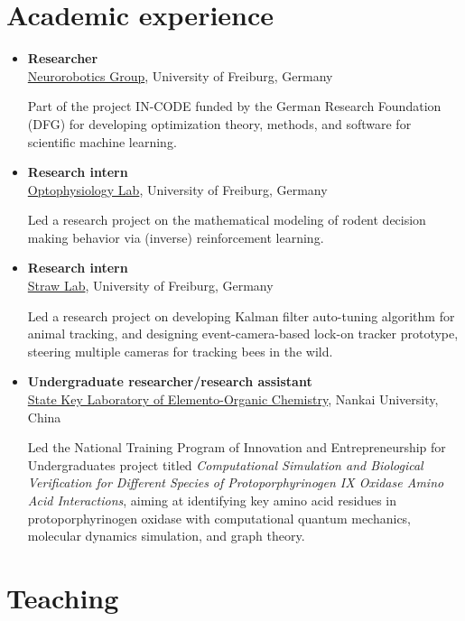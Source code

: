 \documentclass{article}
\newenvironment{cvblock}{%
    \begin{itemize}[
      leftmargin=1in,%
      labelsep=0.3in,%
      font=\itshape,%
      label={}%
    ]
}{%
    \end{itemize}
}
\begin{document}
\section{Academic experience}
\begin{cvblock}
    \item[2024--] \textbf{Researcher}\\
        \href{https://nr.informatik.uni-freiburg.de/welcome}{Neurorobotics Group}, University of Freiburg, Germany\par
        Part of the project IN-CODE funded by the German Research Foundation (DFG) for developing optimization theory, methods, and software for scientific machine learning.
    \item[2022--2023] \textbf{Research intern}\\
        \href{https://www.optophysiology.uni-freiburg.de/}{Optophysiology Lab}, University of Freiburg, Germany\par
        Led a research project on the mathematical modeling of rodent decision making behavior via (inverse) reinforcement learning.
    \item[2022] \textbf{Research intern}\\
        \href{https://strawlab.org/}{Straw Lab}, University of Freiburg, Germany\par
        Led a research project on developing Kalman filter auto-tuning algorithm for animal tracking, and designing event-camera-based lock-on tracker prototype, steering multiple cameras for tracking bees in the wild.
    \item[2017--2021] \textbf{Undergraduate researcher/research assistant}\\
        \href{https://en-skleoc.nankai.edu.cn/}{State Key Laboratory of Elemento-Organic Chemistry}, Nankai University, China\par
        Led the National Training Program of Innovation and Entrepreneurship for Undergraduates project titled \textit{Computational Simulation and Biological Verification for Different Species of Protoporphyrinogen IX Oxidase Amino Acid Interactions}, aiming at identifying key amino acid residues in protoporphyrinogen oxidase with computational quantum mechanics, molecular dynamics simulation, and graph theory.
\end{cvblock}

\section{Teaching}
\end{document}
